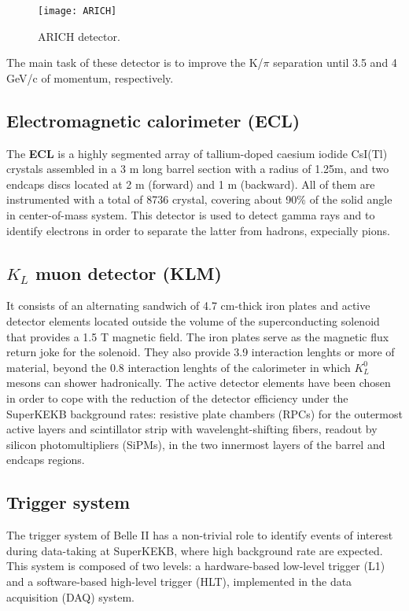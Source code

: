 \begin{figure}
\centering
\texttt{[image: ARICH]}
\caption{ARICH detector.}
\label{ARICH}
\end{figure}


The main task of these detector is to improve the K/$\pi$ separation until 3.5 and 4 GeV/c of momentum, respectively.

\subsection{Electromagnetic calorimeter (ECL)}

The \textbf{ECL} is a highly segmented array of tallium-doped caesium iodide CsI(Tl) crystals assembled in a 3 m long barrel section with a radius of 1.25m, and two endcaps discs located at 2 m (forward) and 1 m (backward). All of them are instrumented with a total of 8736 crystal, covering about 90\% of the solid angle in center-of-mass system. This detector is used to detect gamma rays and to identify electrons in order to separate the latter from hadrons, expecially pions.

\subsection{$K_{L}$ muon detector (KLM)}

It consists of an alternating sandwich of 4.7 cm-thick iron plates and active detector elements located outside the volume of the superconducting solenoid that provides a 1.5 T magnetic field. The iron plates serve as the magnetic flux return joke for the solenoid. They also provide 3.9 interaction lenghts or more of material, beyond the 0.8 interaction lenghts of the calorimeter in which $K_{L}^{0}$ mesons can shower hadronically. The active detector elements have been chosen in order to cope with the reduction of the detector efficiency under the SuperKEKB background rates: resistive plate chambers (RPCs) for the outermost active layers and scintillator strip with wavelenght-shifting fibers, readout by silicon photomultipliers (SiPMs), in the two innermost layers of the barrel and endcaps regions.

\subsection{Trigger system}

The trigger system of Belle II has a non-trivial role to identify events of interest during data-taking at SuperKEKB, where high background rate are expected. 
This system is composed of two levels: a hardware-based low-level trigger (L1) and a software-based high-level trigger (HLT), implemented in the data acquisition (DAQ) system. 

